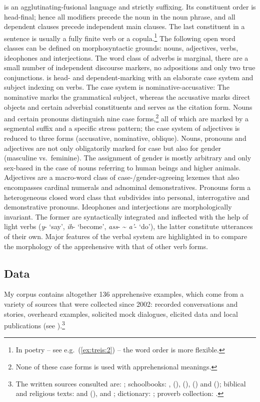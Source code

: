 \documentclass[output=paper,colorlinks,citecolor=brown,]{langscibook}
\begin{document}
 is an agglutinating-fusional language and strictly suffixing. Its constituent order is head-final; hence all modifiers precede the noun in the noun phrase, and all dependent clauses precede independent main clauses. The last constituent in a sentence is usually a fully finite verb or a copula.\footnote{In poetry -- see  e.g.\ (\ref{ex:treis:2}) -- the word order is more flexible.} The following open word classes can be defined on morphosyntactic grounds: nouns, adjectives, verbs, ideophones and interjections. The word class of adverbs is marginal, there are a small number of independent discourse markers, no adpositions and only two true conjunctions.  is head- and dependent-marking with an elaborate case system and subject indexing on verbs. The case system is nominative-accusative: The nominative marks the grammatical subject, whereas the accusative marks direct objects and certain adverbial constituents and serves as the citation form. Nouns and certain pronouns distinguish nine case forms,\footnote{None of these case forms is used with apprehensional meanings.} all of which are marked by a segmental suffix and a specific stress pattern; the case system of adjectives is reduced to three forms (accusative, nominative, oblique). Nouns, pronouns and adjectives are not only obligatorily marked for case but also for gender (masculine vs.\ feminine). The assignment of gender is mostly arbitrary and only sex-based in the case of nouns referring to human beings and higher animals. Adjectives are a macro-word class of case-\slash gender\hyp agreeing lexemes that also encompasses cardinal numerals and adnominal demonstratives. Pronouns form a heterogeneous closed word class that subdivides into personal, interrogative and demonstrative pronouns. Ideophones and interjections are morphologically invariant. The former are syntactically integrated and inflected with the help of light verbs (\textit{y}- `say', \textit{ih}- `become', \textit{ass}- \~{} \textit{a'}- `do'), the latter constitute utterances of their own. Major features of the verbal system are highlighted in  to compare the morphology of the apprehensive with that of other verb forms.

\subsection{Data}\label{sec:treis:1.3}
\largerpage
My corpus contains altogether 136 apprehensive examples, which come from a variety of sources that were collected since 2002: recorded conversations and stories, overheard examples, solicited mock dialogues, elicited data and local publications (see ).\footnote{The written sources consulted are: \citet{Saint-Exupéry2018}; schoolbooks: \citet[grade 1--8]{KEB1989}, (\citeyear[grade 9--10]{KEB2007}), (\citeyear[grade 1--4]{KEB2008a}), (\citeyear[grade 11]{KEB2008b}) and (\citeyear[grade 12]{KEB2010}); biblical and religious texts: \citet{KHTPH2005} and (\citeyear{KHTPHNodate}), and \citet{BrookYonathan2013}; dictionary: \citet{Alemu2016}; proverb collection: \citet{AlamuAlamaayyo2017}.}   
\clearpage
\end{document}
